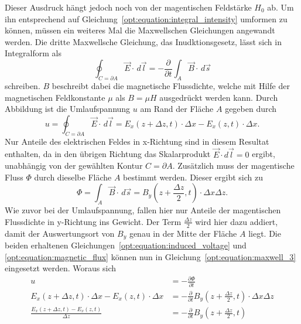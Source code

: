 Dieser Ausdruck hängt jedoch noch von der magentischen Feldstärke $H_0$ ab.
Um ihn entsprechend auf Gleichung~\ref{opt:equation:integral_intensity} umformen zu können, müssen ein weiteres Mal die Maxwellschen Gleichungen angewandt werden.
Die dritte Maxwellsche Gleichung, das Inudktionsgesetz, lässt sich in Integralform als
\begin{equation}
\oint_{C=\partial A} \vec{E} \cdot\, d\vec{l}
=
-\frac{\partial}{\partial t} \int_{A} \vec{B} \cdot\, d\vec{s}
\label{opt:equation:maxwell_3}
\end{equation}
schreiben.
$B$ beschreibt dabei die magnetische Flussdichte, welche mit Hilfe der magnetischen Feldkonstante $\mu$ als $B = \mu H$ ausgedrückt werden kann.
Durch Abbildung  ist die Umlaufspannung $u$ am Rand der Fläche $A$ gegeben durch
\begin{equation}
u
=
\oint_{C=\partial A} \vec{E} \cdot\, d\vec{l}
=
E_x(z+\Delta z,t) \cdot \Delta x - E_x(z,t) \cdot \Delta x
.
\label{opt:equation:induced_voltage}
\end{equation}
Nur Anteile des elektrischen Feldes in x-Richtung sind in diesem Resultat enthalten, da in den übrigen Richtung das Skalarprodukt $\vec{E} \cdot d\vec{l} = 0$ ergibt, unabhängig von der gewählten Kontur $C = \partial A$.
Zusätzlich muss der magentische Fluss $\Phi$ durch dieselbe Fläche $A$ bestimmt werden.
Dieser ergibt sich zu
\begin{equation}
\Phi
=
\int_{A} \vec{B} \cdot\, d\vec{s}
=
B_y\left(z+\frac{\Delta z}{2},t\right) \cdot \Delta x \Delta z
.
\label{opt:equation:magnetic_flux}
\end{equation}
Wie zuvor bei der Umlaufspannung, fallen hier nur Anteile der magentischen Flussdichte in y-Richtung ins Gewicht.
Der Term $\frac{\Delta z}{2}$ wird hier dazu addiert, damit der Auswertungsort von $B_y$ genau in der Mitte der Fläche $A$ liegt.
Die beiden erhaltenen Gleichungen~\ref{opt:equation:induced_voltage} und \ref{opt:equation:magnetic_flux} können nun in Gleichung~\ref{opt:equation:maxwell_3} eingesetzt werden.
Woraus sich
\begin{align}
u
&=
-\frac{\partial\Phi}{\partial t}
\\
E_x(z+\Delta z,t) \cdot \Delta x - E_x(z,t) \cdot \Delta x
&=
-\frac{\partial}{\partial t} B_y\left(z+\frac{\Delta z}{2},t\right) \cdot \Delta x \Delta z
\\
\frac{E_x(z+\Delta z,t) - E_x(z,t)}{\Delta z}
&=
-\frac{\partial}{\partial t} B_y\left(z+\frac{\Delta z}{2},t\right)
\end{align}
